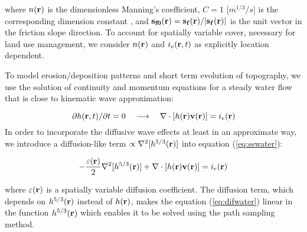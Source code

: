 \documentclass[fleqn,12pt,twoside]{article}
\begin{document}
\noindent
where 
$n({\bf r}) $ is the dimensionless Manning's coefficient, 
$C=1$ [$m^{1/3}/s$] is the corresponding dimension constant \cite{ding84},
and ${\bf s_{f0}}({\bf r})={\bf s_f}({\bf r})/|{\bf s_f}({\bf r})|$
is the unit vector in the friction slope direction.
To account for spatially variable cover, necessary for
land use management, we consider $n({\bf r})$ and $i_e({\bf r},t)$
 as explicitly location dependent.

To model erosion/deposition patterns and short term evolution of topography,
we use the solution of continuity and momentum equations for 
a steady water flow that is close to kinematic wave approximation:

\begin{equation}
\label{eq:sswater}
\partial h({\bf r},t)/\partial t =0 
\quad \longrightarrow \quad
\nabla \cdot [ h({\bf r}){\bf v}({\bf r})] = i_e({\bf r})
\end{equation}
In order to incorporate the diffusive wave effects at least in an approximate way,
we introduce a diffusion-like term
$ \propto \nabla^2 [h^{5/3}({\bf r})]$ into equation (\ref{eq:sswater}):

\begin{equation}
\label{eq:difwater}
-{\varepsilon({\bf r})\over 2 }\nabla^2 [h^{5/3}({\bf r})]
+\nabla \cdot [ h({\bf r}){\bf v}({\bf r})] = i_e({\bf r})
\end{equation}

\noindent
 where $\varepsilon({\bf r})$ is a spatially variable diffusion coefficient.
The diffusion term, which depends on $h^{5/3}({\bf r})$ instead of
$h({\bf r})$, makes the equation (\ref{eq:difwater})  linear
in the function $h^{5/3}({\bf r})$ which enables it to be
solved using the path sampling method.

\end{document}
